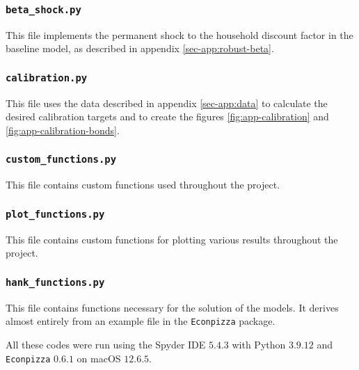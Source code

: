 \documentclass[a4paper,12pt]{article} %
\numberwithin{equation}{section} %
\numberwithin{figure}{section}
\numberwithin{table}{section}
\begin{document}
\begin{refsection}
\begin{appendices}
\subsubsection*{\texttt{beta\_shock.py}}

This file implements the permanent shock to the household discount factor in the baseline model, as described in appendix \ref{sec-app:robust-beta}.

\subsubsection*{\texttt{calibration.py}}

This file uses the data described in appendix \ref{sec-app:data} to calculate the desired calibration targets and to create the figures \ref{fig:app-calibration} and \ref{fig:app-calibration-bonds}.

\subsubsection*{\texttt{custom\_functions.py}}

This file contains custom functions used throughout the project.

\subsubsection*{\texttt{plot\_functions.py}}

This file contains custom functions for plotting various results throughout the project.

\subsubsection*{\texttt{hank\_functions.py}}

This file contains functions necessary for the solution of the models. It derives almost entirely from an example file in the \texttt{Econpizza} package.

\bigskip

All these codes were run using the Spyder IDE $5.4.3$ with Python $3.9.12$ and \texttt{Econpizza} $0.6.1$ on macOS $12.6.5$. 


\end{appendices}
\end{refsection}
\end{document}
